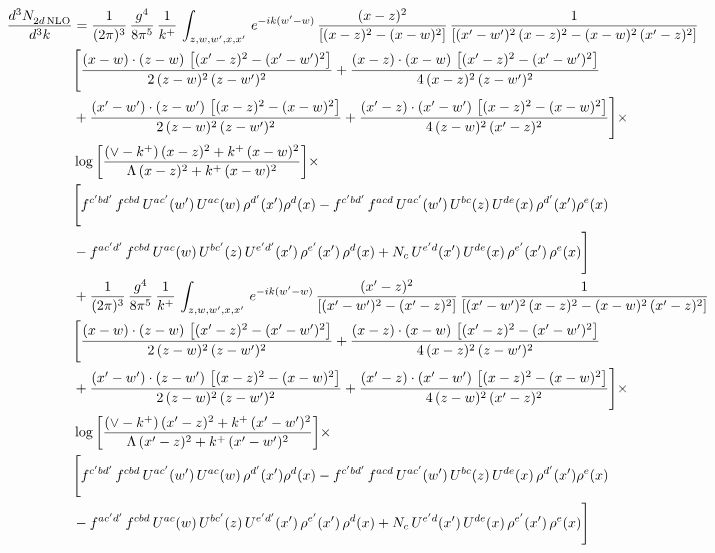 \documentclass[9pt]{article}
\numberwithin{equation}{section}
\begin{document}
\begin{align}
 \frac{d^{3}N_{2d\,\rm NLO}^{\rm}}{d^{3}k}  & = \frac{1}{(2\pi)^{3}}\, \frac{g^{4}}{8\pi^{5}}\,\frac{1}{k^{+}}\,\int_{z,w,w^{\prime},x,x'}\, e^{-ik(w^{\prime}-w)}\,\frac{(x-z)^{2}}{\left[(x-z)^{2}-(x-w)^{2}\right]}\,\frac{1}{\left[(x'-w')^{2}\,(x-z)^{2} - (x-w)^{2}\,(x'-z)^{2}\right]}\notag \\ & \Bigg[\frac{(x-w)\cdot (z-w)\, \left[(x'-z)^{2}-(x'-w')^{2}\right]}{2\, (z-w)^{2}\, (z-w')^{2}}  + \frac{(x-z)\cdot (x-w)\,\left[(x'-z)^{2}-(x'-w')^{2}\right] }{4\,(x-z)^{2}\,(z-w')^{2}}\notag \\ & +\frac{(x'-w')\cdot (z-w')\, \left[(x-z)^{2}-(x-w)^{2}\right]}{2\, (z-w)^{2}\, (z-w')^{2}}+ \frac{(x'-z)\cdot (x'-w')\, \left[(x-z)^{2}-(x-w)^{2}\right]}{4\, (z-w)^{2}\,(x'-z)^{2}}\Bigg]\times\,\notag \\ & \log{\left[\frac{(\vee - k^{+})\, (x-z)^{2} + k^{+}\, (x-w)^{2}}{\Lambda\, (x-z)^{2} + k^{+}\, (x-w)^{2}}\right]} \times\notag \\ & \Bigg[f^{c'bd'}\,f^{cbd}\, U^{ac'}(w')\,U^{ac}(w)\,\rho^{d'}(x')\rho^{d}(x)- f^{c'bd'}\,f^{acd}\,U^{ac'}(w')\,U^{bc}(z)\,U^{de}(x)\,\rho^{d'}(x')\rho^{e}(x) \notag \\ & -f^{ac'd'}\,f^{cbd}\,U^{ac}(w)\,U^{bc'}(z)\,U^{e'd'}(x')\,\rho^{e'}(x')\,\rho^{d}(x) +N_{c}\,U^{e'd}(x')\,U^{de}(x)\,\rho^{e'}(x')\,\rho^{e}(x)\Bigg]\notag \\ & +\frac{1}{(2\pi)^{3}}\, \frac{g^{4}}{8\pi^{5}}\,\frac{1}{k^{+}}\,\int_{z,w,w^{\prime},x,x'}\, e^{-ik(w^{\prime}-w)}\,\frac{(x'-z)^{2}}{\left[(x'-w')^{2}-(x'-z)^{2}\right]}\,\frac{1}{\left[(x'-w')^{2}\,(x-z)^{2} - (x-w)^{2}\,(x'-z)^{2}\right]}\notag \\ & \Bigg[\frac{(x-w)\cdot (z-w)\, \left[(x'-z)^{2}-(x'-w')^{2}\right]}{2\, (z-w)^{2}\, (z-w')^{2}}  + \frac{(x-z)\cdot (x-w)\,\left[(x'-z)^{2}-(x'-w')^{2}\right] }{4\,(x-z)^{2}\,(z-w')^{2}}\notag \\ & +\frac{(x'-w')\cdot (z-w')\, \left[(x-z)^{2}-(x-w)^{2}\right]}{2\, (z-w)^{2}\, (z-w')^{2}}+ \frac{(x'-z)\cdot (x'-w')\, \left[(x-z)^{2}-(x-w)^{2}\right]}{4\, (z-w)^{2}\,(x'-z)^{2}}\Bigg]\times\,\notag \\ & \log{\left[\frac{(\vee - k^{+})\, (x'-z)^{2} + k^{+}\, (x'-w')^{2}}{\Lambda\, (x'-z)^{2} + k^{+}\, (x'-w')^{2}}\right]} \times\notag \\ & \Bigg[f^{c'bd'}\,f^{cbd}\, U^{ac'}(w')\,U^{ac}(w)\,\rho^{d'}(x')\rho^{d}(x)- f^{c'bd'}\,f^{acd}\,U^{ac'}(w')\,U^{bc}(z)\,U^{de}(x)\,\rho^{d'}(x')\rho^{e}(x) \notag \\ & -f^{ac'd'}\,f^{cbd}\,U^{ac}(w)\,U^{bc'}(z)\,U^{e'd'}(x')\,\rho^{e'}(x')\,\rho^{d}(x) +N_{c}\,U^{e'd}(x')\,U^{de}(x)\,\rho^{e'}(x')\,\rho^{e}(x)\Bigg]
\end{align}
\end{document}
